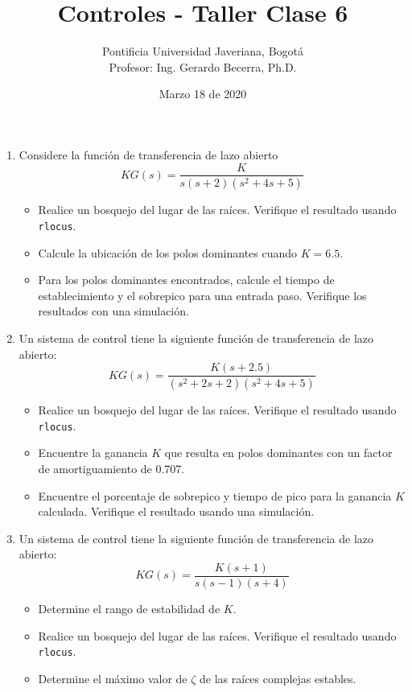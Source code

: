 \documentclass[11pt, spanish]{article}
\title{Controles - Taller Clase 6}
\author{Pontificia Universidad Javeriana, Bogotá\\Profesor: Ing. Gerardo Becerra, Ph.D.}
\date{Marzo 18 de 2020}
\begin{document}
	\maketitle

\begin{enumerate}

	\item Considere la función de transferencia de lazo abierto
	\begin{equation*}
		KG(s) = \frac{K}{s(s+2)(s^2+4s+5)}
	\end{equation*}
	\begin{itemize}
		\item Realice un bosquejo del lugar de las raíces. Verifique el resultado usando \texttt{rlocus}.
		\item Calcule la ubicación de los polos dominantes cuando $K = 6.5$.
		\item Para los polos dominantes encontrados, calcule el tiempo de establecimiento y el sobrepico para una entrada paso. Verifique los resultados con una simulación.
	\end{itemize}

	\item Un sistema de control tiene la siguiente función de transferencia de lazo abierto:
		\begin{equation*}
			KG(s) = \frac{K(s+2.5)}{(s^2+2s+2)(s^2+4s+5)}
		\end{equation*}
		\begin{itemize}
			\item Realice un bosquejo del lugar de las raíces. Verifique el resultado usando \texttt{rlocus}.
			\item Encuentre la ganancia $K$ que resulta en polos dominantes con un factor de amortiguamiento de 0.707.
			\item Encuentre el porcentaje de sobrepico y tiempo de pico para la ganancia $K$ calculada. Verifique el resultado usando una simulación.
		\end{itemize}

	\item Un sistema de control tiene la siguiente función de transferencia de lazo abierto:
		\begin{equation*}
			KG(s) = \frac{K(s+1)}{s(s-1)(s+4)}
		\end{equation*}
		\begin{itemize}
			\item Determine el rango de estabilidad de $K$.
			\item Realice un bosquejo del lugar de las raíces. Verifique el resultado usando \texttt{rlocus}.
			\item Determine el máximo valor de $\zeta$ de las raíces complejas estables.
		\end{itemize}


\end{enumerate}
\end{document}
